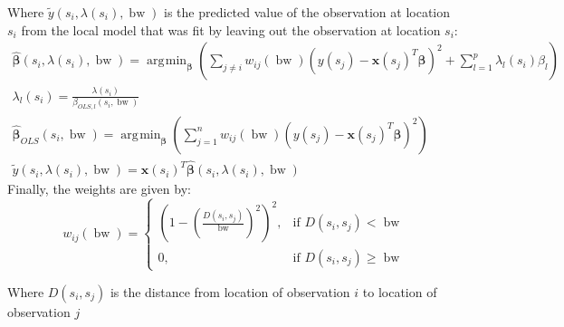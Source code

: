 \documentclass[authoryear ,review]{elsarticle}
\DeclareMathOperator*{\argmin}{\arg\!\min}
\DeclareMathOperator*{\bw}{\mbox{bw}}
\newcommand{\vect}[1]{\boldsymbol{#1}}
\begin{document}
		Where $\tilde{y}\left(s_i, \lambda(s_i), \bw \right)$ is the predicted value of the observation at location $s_i$ from the local model that was fit by leaving out the observation at location $s_i$:
		\begin{gather*}
			\hat{\vect{\beta}}\left(s_i, \lambda(s_i), \bw \right) = \argmin_{\vect{\beta}} \left( \sum_{j \neq i} w_{ij}(\bw)\left(y(s_j) - \vect{x}(s_j)^T \vect{\beta}\right)^2  +  \sum_{l=1}^p \lambda_{l}(s_i) \beta_l \right)\\
			\lambda_{l}(s_i) = \frac{\lambda(s_i)}{\beta_{OLS,l}(s_i, \bw)}\\
			\hat{\vect{\beta}}_{OLS}(s_i, \bw) = \argmin_{\vect{\beta}} \left( \sum_{j=1}^{n} w_{ij}(\bw)\left(y(s_j) - \vect{x}(s_j)^T \vect{\beta}\right)^2\right)\\
			\tilde{y}\left(s_i, \lambda(s_i), \bw \right) = \vect{x}(s_i)^T \hat{\vect{\beta}}\left(s_i, \lambda(s_i), \bw \right)
		\end{gather*}
		Finally, the weights are given by:
		\[
			w_{ij}(\bw) =  \begin{cases} \left(1-\left(\frac{D(s_i,s_j)}{\bw}\right)^2\right)^2, & \mbox{if } D(s_i,s_j) < \bw \\
			0, & \mbox{if }D(s_i,s_j) \ge \bw \end{cases}
		\]
		
		Where $D(s_i,s_j)$ is the distance from location of observation $i$ to location of observation $j$\\
		
\end{document}
